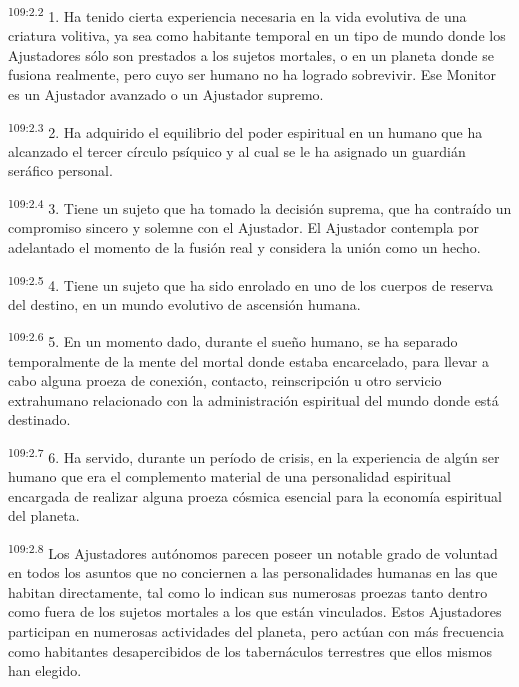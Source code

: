 \par
\textsuperscript{109:2.2} 1. Ha tenido cierta experiencia necesaria en la vida evolutiva de una criatura volitiva, ya sea como habitante temporal en un tipo de mundo donde los Ajustadores sólo son prestados a los sujetos mortales, o en un planeta donde se fusiona realmente, pero cuyo ser humano no ha logrado sobrevivir. Ese Monitor es un Ajustador avanzado o un Ajustador supremo.

\par
\textsuperscript{109:2.3} 2. Ha adquirido el equilibrio del poder espiritual en un humano que ha alcanzado el tercer círculo psíquico y al cual se le ha asignado un guardián seráfico personal.

\par
\textsuperscript{109:2.4} 3. Tiene un sujeto que ha tomado la decisión suprema, que ha contraído un compromiso sincero y solemne con el Ajustador. El Ajustador contempla por adelantado el momento de la fusión real y considera la unión como un hecho.

\par
\textsuperscript{109:2.5} 4. Tiene un sujeto que ha sido enrolado en uno de los cuerpos de reserva del destino, en un mundo evolutivo de ascensión humana.

\par
\textsuperscript{109:2.6} 5. En un momento dado, durante el sueño humano, se ha separado temporalmente de la mente del mortal donde estaba encarcelado, para llevar a cabo alguna proeza de conexión, contacto, reinscripción u otro servicio extrahumano relacionado con la administración espiritual del mundo donde está destinado.

\par
\textsuperscript{109:2.7} 6. Ha servido, durante un período de crisis, en la experiencia de algún ser humano que era el complemento material de una personalidad espiritual encargada de realizar alguna proeza cósmica esencial para la economía espiritual del planeta.

\par
\textsuperscript{109:2.8} Los Ajustadores autónomos parecen poseer un notable grado de voluntad en todos los asuntos que no conciernen a las personalidades humanas en las que habitan directamente, tal como lo indican sus numerosas proezas tanto dentro como fuera de los sujetos mortales a los que están vinculados. Estos Ajustadores participan en numerosas actividades del planeta, pero actúan con más frecuencia como habitantes desapercibidos de los tabernáculos terrestres que ellos mismos han elegido.

